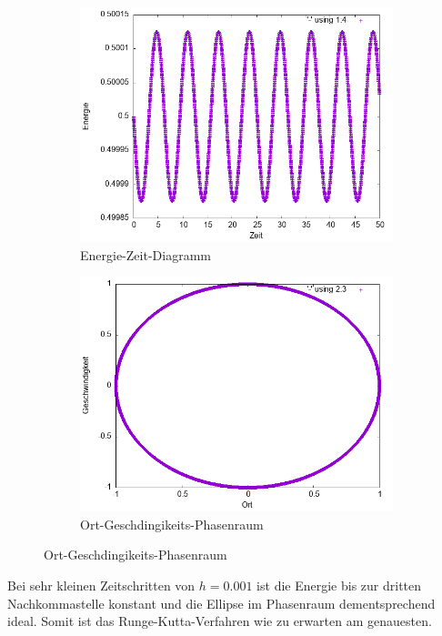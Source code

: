 \documentclass[
    oneside,
    ngerman,
    footinclude=false,
    captions=tableheading,
    DIV=12
]{scrartcl}
\begin{document}
            \begin{figure}[H]
            \centering
            \begin{subfigure}[b]{0.45\textwidth}
                \centering
                \includegraphics[width=\textwidth]{Bilddateien/RK2A1(a)-0001-E.png}
                \caption{Energie-Zeit-Diagramm}
                \label{fig:RK2A1(a)-0001-0-E}
            \end{subfigure}
            \hfill
            \begin{subfigure}[b]{0.45\textwidth}
                \centering
                \includegraphics[width=\textwidth]{Bilddateien/RK2A1(a)-0001-0-xv.png}
                \caption{Ort-Geschdingikeits-Phasenraum}
                \label{fig:RK2A1(a)-0001-0-xv}
            \end{subfigure}
            \end{figure}
            Bei sehr kleinen Zeitschritten von $h=0.001$ ist die Energie bis zur dritten Nachkommastelle konstant und die Ellipse im Phasenraum dementsprechend ideal. Somit ist das Runge-Kutta-Verfahren wie zu erwarten am genauesten.
\end{document}

